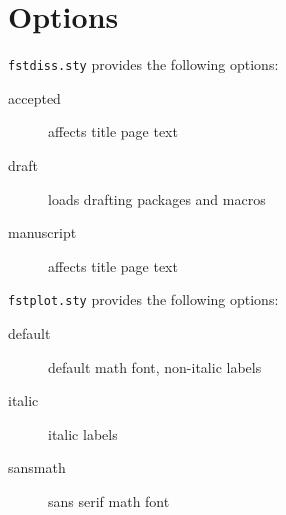


\section{Options}

\texttt{fstdiss.sty} provides the following options:

\begin{description}
  \item[accepted] affects title page text
  \item[draft] loads drafting packages and macros
  \item[manuscript] affects title page text
\end{description}

\texttt{fstplot.sty} provides the following options:

\begin{description}
  \item[default] default math font, non-italic labels
  \item[italic] italic labels
  \item[sansmath] sans serif math font
\end{description}
